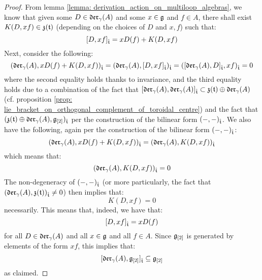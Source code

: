             \begin{proof}
                From lemma \ref{lemma: derivation_action_on_multiloop_algebras}, we know that given some $D \in \mathfrak{der}_{\gamma}(A)$ and some $x \in \mathfrak{g}$ and $f \in A$, there shall exist $K(D, xf) \in \mathfrak{z}(\mathfrak{t})$ (depending on the choices of $D$ and $x, f$) such that:
                    $$[D, xf]_{\hat{\mathfrak{t}}} = x D(f) + K(D, xf)$$
                Next, consider the following:
                    $$( \mathfrak{der}_{\gamma}(A), x D(f) + K(D, xf) )_{\hat{\mathfrak{t}}} = ( \mathfrak{der}_{\gamma}(A), [D, xf]_{\hat{\mathfrak{t}}} )_{\hat{\mathfrak{t}}} = ( [\mathfrak{der}_{\gamma}(A), D]_{\hat{\mathfrak{t}}}, xf )_{\hat{\mathfrak{t}}} = 0$$
                where the second equality holds thanks to invariance, and the third equality holds due to a combination of the fact that $[\mathfrak{der}_{\gamma}(A), \mathfrak{der}_{\gamma}(A)]_{\hat{\mathfrak{t}}} \subset \mathfrak{z}(\mathfrak{t}) \oplus \mathfrak{der}_{\gamma}(A)$ (cf. proposition \ref{prop: lie_bracket_on_orthogonal_complement_of_toroidal_centre}) and the fact that $(\mathfrak{z}(\mathfrak{t}) \oplus \mathfrak{der}_{\gamma}(A), \mathfrak{g}_{[2]})_{\hat{\mathfrak{t}}}$ per the construction of the bilinear form $(-, -)_{\hat{\mathfrak{t}}}$. We also have the following, again per the construction of the bilinear form $(-, -)_{\hat{\mathfrak{t}}}$:
                    $$( \mathfrak{der}_{\gamma}(A), x D(f) + K(D, xf) )_{\hat{\mathfrak{t}}} = ( \mathfrak{der}_{\gamma}(A), K(D, xf) )_{\hat{\mathfrak{t}}}$$
                which means that:
                    $$( \mathfrak{der}_{\gamma}(A), K(D, xf) )_{\hat{\mathfrak{t}}} = 0$$
                The non-degeneracy of $(-, -)_{\hat{\mathfrak{t}}}$ (or more particularly, the fact that $( \mathfrak{der}_{\gamma}(A), \mathfrak{z}(\mathfrak{t}) )_{\hat{\mathfrak{t}}} \not = 0$) then implies that:
                    $$K(D, xf) = 0$$
                necessarily. This means that, indeed, we have that:
                    $$[D, xf]_{\hat{\mathfrak{t}}} = x D(f)$$
                for all $D \in \mathfrak{der}_{\gamma}(A)$ and all $x \in \mathfrak{g}$ and all $f \in A$. Since $\mathfrak{g}_{[2]}$ is generated by elements of the form $xf$, this implies that:
                    $$[\mathfrak{der}_{\gamma}(A), \mathfrak{g}_{[2]}]_{\hat{\mathfrak{t}}} \subseteq \mathfrak{g}_{[2]}$$
                as claimed. 
            \end{proof}
            
